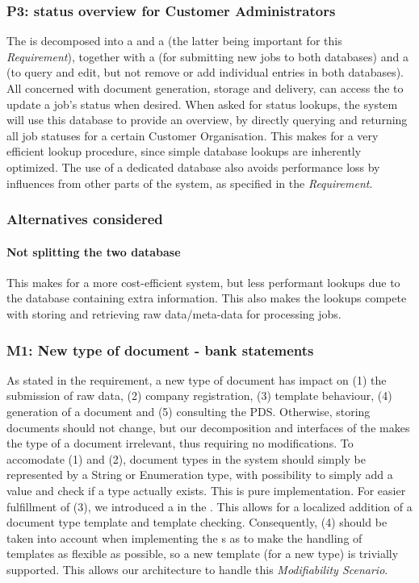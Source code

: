 \subsubsection{P3: status overview for Customer Administrators}\label{march:p3}
The  is decomposed into a  and a  (the latter being important for this \emph{Requirement}), together with a  (for submitting new jobs to both databases) and a  (to query and edit, but not remove or add individual entries in both databases). All  concerned with document generation, storage and delivery, can access the  to update a job's status when desired. When asked for status lookups, the system will use this database to provide an overview, by directly querying and returning all job statuses for a certain Customer Organisation. This makes for a very efficient lookup procedure, since simple database lookups are inherently optimized. The use of a dedicated database also avoids performance loss by influences from other parts of the system, as specified in the \emph{Requirement}.

\subsubsection*{Alternatives considered}
\paragraph{Not splitting the two database} This makes for a more cost-efficient system, but less performant lookups due to the database containing extra information. This also makes the lookups compete with storing and retrieving raw data/meta-data for processing jobs.

\subsubsection{M1: New type of document - bank statements}\label{march:m1}
As stated in the requirement, a new type of document has impact on (1) the submission of raw data, (2) company registration, (3) template behaviour, (4) generation of a document and (5) consulting the PDS. Otherwise, storing documents should not change, but our decomposition and interfaces of the  makes the type of a document irrelevant, thus requiring no modifications. To accomodate (1) and (2), document types in the system should simply be represented by a String or Enumeration type, with possibility to simply add a value and check if a type actually exists. This is pure implementation. For easier fulfillment of (3), we introduced a  in the . This allows for a localized addition of a document type template and template checking. Consequently, (4) should be taken into account when implementing the s as to make the handling of templates as flexible as possible, so a new template (for a new type) is trivially supported. This allows our architecture to handle this \emph{Modifiability Scenario}.

